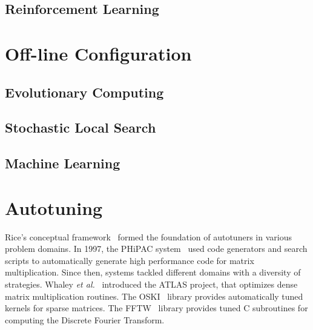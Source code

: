\subsection{Reinforcement Learning}
\label{subsec:reinforce}

\section{Off-line Configuration}
\label{sec:offconfig}

\subsection{Evolutionary Computing}
\label{subsec:evolcomp}

\subsection{Stochastic Local Search}
\label{subsec:searchsls}

\subsection{Machine Learning}
\label{subsec:searchml}

\section{Autotuning}
\label{chap:autotuning}

Rice's conceptual framework~\cite{rice1976algorithm} formed the foundation of
autotuners in various problem domains.  In 1997, the PHiPAC
system~\cite{bilmes1997optimizing} used code generators and search scripts to
automatically generate high performance code for matrix multiplication. Since
then, systems tackled different domains with a diversity of strategies. Whaley
\emph{et al.}~\cite{dongarra1998automatically} introduced the ATLAS project,
that optimizes dense matrix multiplication routines. The
OSKI~\cite{vuduc2005oski} library provides automatically tuned kernels for
sparse matrices. The FFTW~\cite{frigo1998fftw} library provides tuned C
subroutines for computing the Discrete Fourier Transform.


